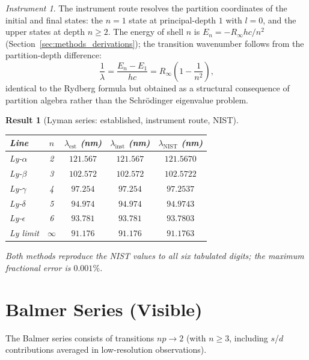 \documentclass[11pt,a4paper]{article}
\theoremstyle{stmtstyle}
\newtheorem{result}{Result}
\theoremstyle{definition}
\theoremstyle{remark}
\newtheorem*{instrument}{Instrument}
\begin{document}
\begin{instrument}
The instrument route resolves the partition coordinates of the initial and final states: the $n=1$ state at principal-depth $1$ with $l=0$, and the upper states at depth $n \geq 2$. The energy of shell $n$ is $E_{n} = -R_{\infty} hc / n^{2}$ (Section~\ref{sec:methods_derivations}); the transition wavenumber follows from the partition-depth difference:
\begin{equation}
\frac{1}{\lambda} = \frac{E_{n} - E_{1}}{hc} = R_{\infty}\left(1 - \frac{1}{n^{2}}\right),
\end{equation}
identical to the Rydberg formula but obtained as a structural consequence of partition algebra rather than the Schr\"odinger eigenvalue problem.
\end{instrument}

\begin{result}[Lyman series: established, instrument route, NIST]
\label{res:lyman}
\begin{center}\small
\begin{tabular}{lcccc}
\toprule
Line & $n$ & $\lambda_{\mathrm{est}}$ (nm) & $\lambda_{\mathrm{inst}}$ (nm) & $\lambda_{\mathrm{NIST}}$ (nm)\\
\midrule
Ly-$\alpha$ & 2 & $121.567$ & $121.567$ & $121.5670$\\
Ly-$\beta$  & 3 & $102.572$ & $102.572$ & $102.5722$\\
Ly-$\gamma$ & 4 & $97.254$  & $97.254$  & $97.2537$\\
Ly-$\delta$ & 5 & $94.974$  & $94.974$  & $94.9743$\\
Ly-$\epsilon$ & 6 & $93.781$ & $93.781$ & $93.7803$\\
Ly limit & $\infty$ & $91.176$ & $91.176$ & $91.1763$\\
\bottomrule
\end{tabular}
\end{center}
Both methods reproduce the NIST values to all six tabulated digits; the maximum fractional error is $0.001\%$.
\end{result}

\section{Balmer Series (Visible)}
\label{sec:hbalmer}

The Balmer series consists of transitions $np \to 2$ (with $n \geq 3$, including $s$/$d$ contributions averaged in low-resolution observations).
\end{document}
